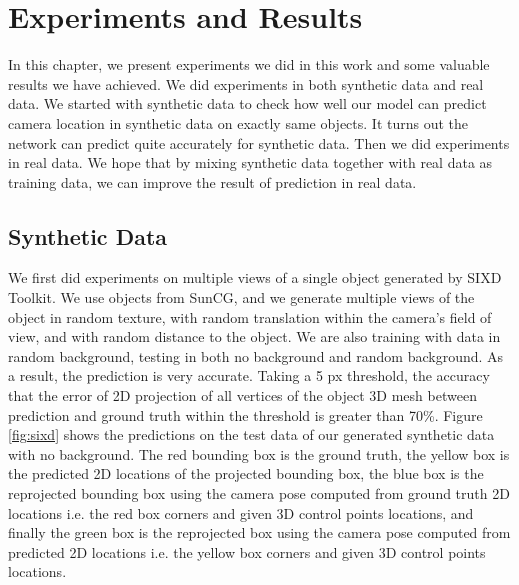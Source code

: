 \chapter{Experiments and Results}

In this chapter, we present experiments we did in this work and some valuable results we have achieved. We did experiments in both synthetic data and real data. We started with synthetic data to check how well our model can predict camera location in synthetic data on exactly same objects. It turns out the network can predict quite accurately for synthetic data. Then we did experiments in real data. We hope that by mixing synthetic data together with real data as training data, we can improve the result of prediction in real data.

\section{Synthetic Data}

We first did experiments on multiple views of a single object generated by SIXD Toolkit. We use objects from SunCG, and we generate multiple views of the object in random texture, with random translation within the camera's field of view, and with random distance to the object. We are also training with data in random background, testing in both no background and random background. As a result, the prediction is very accurate. Taking a 5 px threshold, the accuracy that the error of 2D projection of all vertices of the object 3D mesh between prediction and ground truth within the threshold is greater than 70\%. Figure \ref{fig:sixd} shows the predictions on the test data of our generated synthetic data with no background. The red bounding box is the ground truth, the yellow box is the predicted 2D locations of the projected bounding box, the blue box is the reprojected bounding box using the camera pose computed from ground truth 2D locations i.e. the red box corners and given 3D control points locations, and finally the green box is the reprojected box using the camera pose computed from predicted 2D locations i.e. the yellow box corners and given 3D control points locations.


